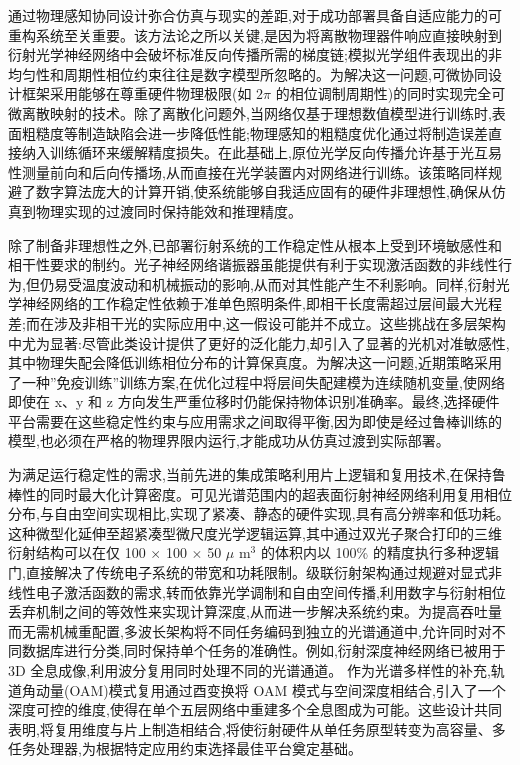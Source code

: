 \documentclass[11pt]{article}
\begin{document}
通过物理感知协同设计弥合仿真与现实的差距,对于成功部署具备自适应能力的可重构系统至关重要。该方法论之所以关键,是因为将离散物理器件响应直接映射到衍射光学神经网络中会破坏标准反向传播所需的梯度链;模拟光学组件表现出的非均匀性和周期性相位约束往往是数字模型所忽略的。为解决这一问题,可微协同设计框架采用能够在尊重硬件物理极限(如 \(2\pi\) 的相位调制周期性)的同时实现完全可微离散映射的技术。除了离散化问题外,当网络仅基于理想数值模型进行训练时,表面粗糙度等制造缺陷会进一步降低性能;物理感知的粗糙度优化通过将制造误差直接纳入训练循环来缓解精度损失。在此基础上,原位光学反向传播允许基于光互易性测量前向和后向传播场,从而直接在光学装置内对网络进行训练。该策略同样规避了数字算法庞大的计算开销,使系统能够自我适应固有的硬件非理想性,确保从仿真到物理实现的过渡同时保持能效和推理精度。\citep{doi_10_1145_3508352_3549378_13c53996} \citep{doi_10_1109_dac56929_2023_10247715_f78d6713} \citep{doi_10_1364_prj_389553_d7a30418}

除了制备非理想性之外,已部署衍射系统的工作稳定性从根本上受到环境敏感性和相干性要求的制约。光子神经网络谐振器虽能提供有利于实现激活函数的非线性行为,但仍易受温度波动和机械振动的影响,从而对其性能产生不利影响。同样,衍射光学神经网络的工作稳定性依赖于准单色照明条件,即相干长度需超过层间最大光程差;而在涉及非相干光的实际应用中,这一假设可能并不成立。这些挑战在多层架构中尤为显著:尽管此类设计提供了更好的泛化能力,却引入了显著的光机对准敏感性,其中物理失配会降低训练相位分布的计算保真度。为解决这一问题,近期策略采用了一种''免疫训练''训练方案,在优化过程中将层间失配建模为连续随机变量,使网络即使在 x、y 和 z 方向发生严重位移时仍能保持物体识别准确率。最终,选择硬件平台需要在这些稳定性约束与应用需求之间取得平衡,因为即使是经过鲁棒训练的模型,也必须在严格的物理界限内运行,才能成功从仿真过渡到实际部署。\citep{doi_10_3390_nano14080697_c372a140} \citep{doi_10_1364_oe_523619_ddeb1b53} \citep{doi_10_1515_nanoph_2020_0291_c4a9f42d}

为满足运行稳定性的需求,当前先进的集成策略利用片上逻辑和复用技术,在保持鲁棒性的同时最大化计算密度。可见光谱范围内的超表面衍射神经网络利用复用相位分布,与自由空间实现相比,实现了紧凑、静态的硬件实现,具有高分辨率和低功耗。这种微型化延伸至超紧凑型微尺度光学逻辑运算,其中通过双光子聚合打印的三维衍射结构可以在仅 100 \(\times\) 100 \(\times\) 50 \(\mu\) m\(^{3}\) 的体积内以 100\% 的精度执行多种逻辑门,直接解决了传统电子系统的带宽和功耗限制。级联衍射架构通过规避对显式非线性电子激活函数的需求,转而依靠光学调制和自由空间传播,利用数字与衍射相位丢弃机制之间的等效性来实现计算深度,从而进一步解决系统约束。为提高吞吐量而无需机械重配置,多波长架构将不同任务编码到独立的光谱通道中,允许同时对不同数据库进行分类,同时保持单个任务的准确性。例如,衍射深度神经网络已被用于 3D 全息成像,利用波分复用同时处理不同的光谱通道。\citep{doi_10_1109_acp_ipoc63121_2024_10809872_a7935774} 作为光谱多样性的补充,轨道角动量(OAM)模式复用通过酉变换将 OAM 模式与空间深度相结合,引入了一个深度可控的维度,使得在单个五层网络中重建多个全息图成为可能。这些设计共同表明,将复用维度与片上制造相结合,将使衍射硬件从单任务原型转变为高容量、多任务处理器,为根据特定应用约束选择最佳平台奠定基础。\citep{doi_10_3390_mi16010008_4be72643} \citep{doi_10_1021_acsphotonics_5c02472_283a8bea} \citep{doi_10_1515_nanoph_2022_0615_9a3be8d6} \citep{doi_10_1364_oe_447337_61ffab71} \citep{doi_10_1364_ol_428761_f1f67ac8}
\end{document}
